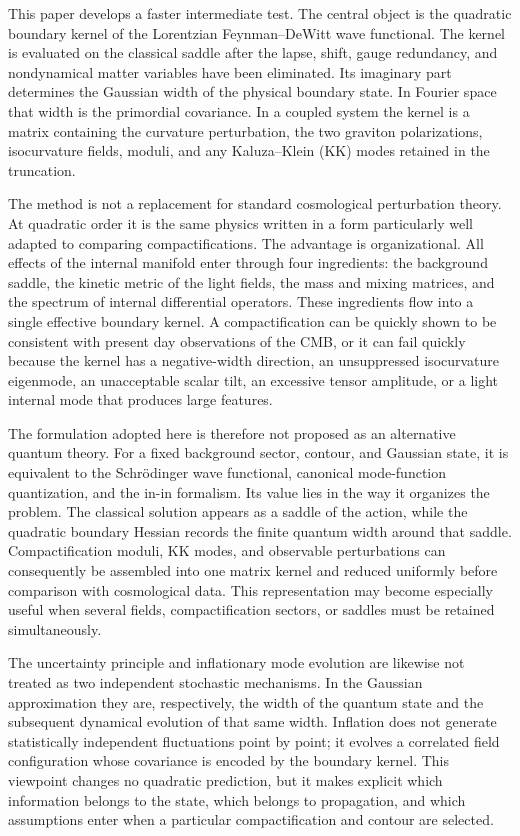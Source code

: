 \documentclass[aps,prd,twocolumn,superscriptaddress,nofootinbib,longbibliography,floatfix]{revtex4-2}
\begin{document}
This paper develops a faster intermediate test. The central object is the quadratic boundary kernel of the Lorentzian Feynman--DeWitt wave functional. The kernel is evaluated on the classical saddle after the lapse, shift, gauge redundancy, and nondynamical matter variables have been eliminated. Its imaginary part determines the Gaussian width of the physical boundary state. In Fourier space that width is the primordial covariance. In a coupled system the kernel is a matrix containing the curvature perturbation, the two graviton polarizations, isocurvature fields, moduli, and any Kaluza--Klein (KK) modes retained in the truncation.

The method is not a replacement for standard cosmological perturbation theory. At quadratic order it is the same physics written in a form particularly well adapted to comparing compactifications. The advantage is organizational. All effects of the internal manifold enter through four ingredients: the background saddle, the kinetic metric of the light fields, the mass and mixing matrices, and the spectrum of internal differential operators. These ingredients flow into a single effective boundary kernel. A compactification can be quickly shown to be consistent with present day observations of the CMB, or it can fail quickly because the kernel has a negative-width direction, an unsuppressed isocurvature eigenmode, an unacceptable scalar tilt, an excessive tensor amplitude, or a light internal mode that produces large features.

The formulation adopted here is therefore not proposed as an alternative quantum theory. For a fixed background sector, contour, and Gaussian state, it is equivalent to the Schrödinger wave functional, canonical mode-function quantization, and the in-in formalism. Its value lies in the way it organizes the problem. The classical solution appears as a saddle of the action, while the quadratic boundary Hessian records the finite quantum width around that saddle. Compactification moduli, KK modes, and observable perturbations can consequently be assembled into one matrix kernel and reduced uniformly before comparison with cosmological data. This representation may become especially useful when several fields, compactification sectors, or saddles must be retained simultaneously.

The uncertainty principle and inflationary mode evolution are likewise not treated as two independent stochastic mechanisms. In the Gaussian approximation they are, respectively, the width of the quantum state and the subsequent dynamical evolution of that same width. Inflation does not generate statistically independent fluctuations point by point; it evolves a correlated field configuration whose covariance is encoded by the boundary kernel. This viewpoint changes no quadratic prediction, but it makes explicit which information belongs to the state, which belongs to propagation, and which assumptions enter when a particular compactification and contour are selected.
\end{document}
